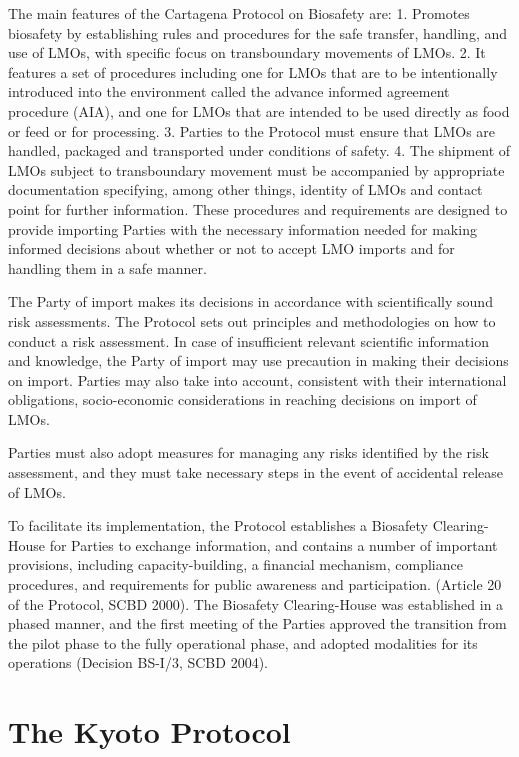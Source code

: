 \documentclass[
]{book}
\begin{document}
The main features of the Cartagena Protocol on Biosafety are:
1. Promotes biosafety by establishing rules and procedures for the safe transfer, handling, and use of LMOs, with specific focus on transboundary movements of LMOs.
2. It features a set of procedures including one for LMOs that are to be intentionally introduced into the environment called the advance informed agreement procedure (AIA), and one for LMOs that are intended to be used directly as food or feed or for processing.
3. Parties to the Protocol must ensure that LMOs are handled, packaged and transported under conditions of safety.
4. The shipment of LMOs subject to transboundary movement must be accompanied by appropriate documentation specifying, among other things, identity of LMOs and contact point for further information.
These procedures and requirements are designed to provide importing Parties with the necessary information needed for making informed decisions about whether or not to accept LMO imports and for handling them in a safe manner.

The Party of import makes its decisions in accordance with scientifically sound risk assessments. The Protocol sets out principles and methodologies on how to conduct a risk assessment. In case of insufficient relevant scientific information and knowledge, the Party of import may use precaution in making their decisions on import. Parties may also take into account, consistent with their international obligations, socio-economic considerations in reaching decisions on import of LMOs.

Parties must also adopt measures for managing any risks identified by the risk assessment, and they must take necessary steps in the event of accidental release of LMOs.

To facilitate its implementation, the Protocol establishes a Biosafety Clearing-House for Parties to exchange information, and contains a number of important provisions, including capacity-building, a financial mechanism, compliance procedures, and requirements for public awareness and participation. (Article 20 of the Protocol, SCBD 2000). The Biosafety Clearing-House was established in a phased manner, and the first meeting of the Parties approved the transition from the pilot phase to the fully operational phase, and adopted modalities for its operations (Decision BS-I/3, SCBD 2004).

\hypertarget{the-kyoto-protocol}{%
\section{The Kyoto Protocol}\label{the-kyoto-protocol}}
\end{document}
